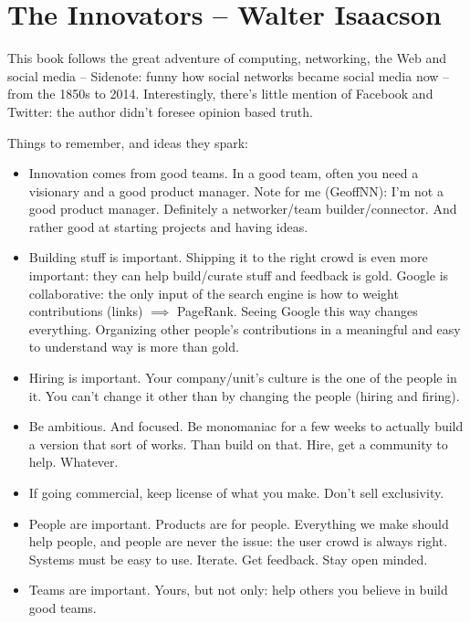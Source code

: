 
\section{The Innovators -- Walter Isaacson}

This book follows the great adventure of computing, networking, the Web and social media
-- Sidenote: funny how social networks became social media now --
from the 1850s to 2014.
Interestingly, there's little mention of Facebook and Twitter: the author didn't foresee opinion based truth.

Things to remember, and ideas they spark:

\begin{itemize}
    \item Innovation comes from good teams. 
    In a good team, often you need a visionary and a good product manager. 
    Note for me (GeoffNN): I'm not a good product manager.
    Definitely a networker/team builder/connector.
    And rather good at starting projects and having ideas.
    \item Building stuff is important.
    Shipping it to the right crowd is even more important: they can help build/curate stuff and feedback is gold.
    Google is collaborative: the only input of the search engine is how to weight contributions (links) $\implies$ PageRank.
    Seeing Google this way changes everything.
    Organizing other people's contributions in a meaningful and easy to understand way is more than gold.
    \item Hiring is important.
    Your company/unit's culture is the one of the people in it.
    You can't change it other than by changing the people (hiring and firing).
    \item Be ambitious.
    And focused.
    Be monomaniac for a few weeks to actually build a version that sort of works.
    Than build on that.
    Hire, get a community to help.
    Whatever.
    \item If going commercial, keep license of what you make.
    Don't sell exclusivity.
    \item People are important.
    Products are for people.
    Everything we make should help people, and people are never the issue: the user crowd is always right.
    Systems must be easy to use.
    Iterate.
    Get feedback.
    Stay open minded.
    \item Teams are important.
    Yours, but not only: help others you believe in build good teams.

\end{itemize}
